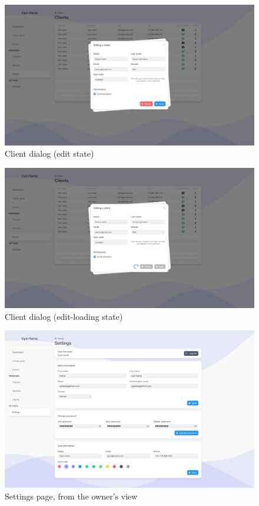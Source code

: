 \documentclass[a4paper, 12pt, oneside]{book}
\begin{document}
\begin{figure}[H]
	\centering
	\includegraphics[width=\textwidth]{assets/ui/ClientsEdit.png}
	\caption{Client dialog (edit state)}
\end{figure}
\begin{figure}[H]
	\centering
	\includegraphics[width=\textwidth]{assets/ui/ClientsEditLoading.png}
	\caption{Client dialog (edit-loading state)}
\end{figure}
\begin{figure}[H]
	\centering
	\includegraphics[width=\textwidth]{assets/ui/Owner.png}
	\caption{Settings page, from the owner's view}
\end{figure}
\end{document}

